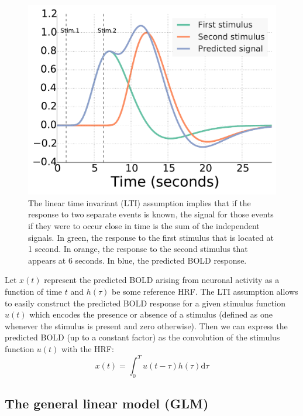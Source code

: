 \begin{figure}
\centering \includegraphics[width=.8\linewidth]{figures/chapter_1/linear_hrf.pdf}
\caption{The linear time invariant (LTI) assumption implies that if the response to two separate events is known, the signal for those events if they were to occur close in time is the sum of the independent signals. In green, the response to the first stimulus that is located at 1 second. In orange, the response to the second stimulus that appears at 6 seconds. In blue, the predicted BOLD response.}\label{fig:lti_hrf} 
\end{figure}






Let $x(t)$ represent the predicted BOLD arising from neuronal activity as a function of time $t$ and $h(\tau)$ be some reference HRF. The LTI assumption allows to easily construct the predicted BOLD response for a given stimulus function $u(t)$ which encodes the presence or absence of a stimulus (defined as one whenever the stimulus is present and zero otherwise). Then we can express the predicted BOLD (up to a constant factor) as the convolution of the stimulus function $u(t)$ with the HRF:
\begin{equation}
x(t) = \int_{0}^T\!u(t - \tau) h(\tau) \mathrm{d}\tau
\label{eq:chap1_predicted_bold}
\end{equation}

\subsection{The general linear model (GLM)}\label{chapter_1_GLM}


